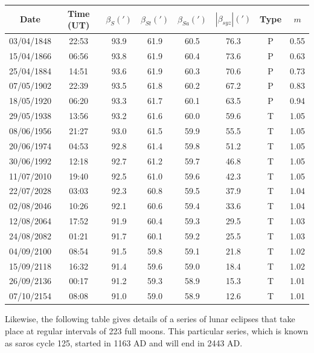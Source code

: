 \begin{center}
\begin{tabular}{cccccccc}
Date & Time (UT) & $\beta_{S}(')$ & $\beta_{St}(')$ & $\beta_{Sa}(')$ & $|\beta_{syz}|(')$ & Type & $m$\\\hline
03/04/1848 &  22:53 & 93.9 & 61.9 & 60.5 & 76.3 & P & 0.55\\
15/04/1866 &  06:56 & 93.8 & 61.9 & 60.4 & 73.6 & P & 0.63\\
25/04/1884 &  14:51 & 93.6 & 61.9 & 60.3 & 70.6 & P & 0.73\\
07/05/1902 &  22:39 & 93.5 & 61.8 & 60.2 & 67.2 & P & 0.83\\
18/05/1920 &  06:20 & 93.3 & 61.7 & 60.1 & 63.5 & P & 0.94\\
29/05/1938 &  13:56 & 93.2 & 61.6 & 60.0 & 59.6 & T & 1.05\\
08/06/1956 &  21:27 & 93.0 & 61.5 & 59.9 & 55.5 & T & 1.05\\
20/06/1974 &  04:53 & 92.8 & 61.4 & 59.8 & 51.2 & T & 1.05\\
30/06/1992 &  12:18 & 92.7 & 61.2 & 59.7 & 46.8 & T & 1.05\\
11/07/2010 &  19:40 & 92.5 & 61.0 & 59.6 & 42.3 & T & 1.05\\
22/07/2028 &  03:03 & 92.3 & 60.8 & 59.5 & 37.9 & T & 1.04\\
02/08/2046 &  10:26 & 92.1 & 60.6 & 59.4 & 33.6 & T & 1.04\\
12/08/2064 &  17:52 & 91.9 & 60.4 & 59.3 & 29.5 & T & 1.03\\
24/08/2082 &  01:21 & 91.7 & 60.1 & 59.2 & 25.5 & T & 1.03\\
04/09/2100 &  08:54 & 91.5 & 59.8 & 59.1 & 21.8 & T & 1.02\\
15/09/2118 &  16:32 & 91.4 & 59.6 & 59.0 & 18.4 & T & 1.02\\
26/09/2136 &  00:17 & 91.2 & 59.3 & 58.9 & 15.3 & T & 1.01\\
07/10/2154 &  08:08 & 91.0 & 59.0 & 58.9 & 12.6 & T & 1.01\\
\end{tabular}
\end{center}

Likewise, the following table gives details of a series of lunar eclipses that take place at regular intervals of 223 full moons. This particular series, which is known as saros cycle 125, started in 1163 AD and will end in 2443 AD. 


